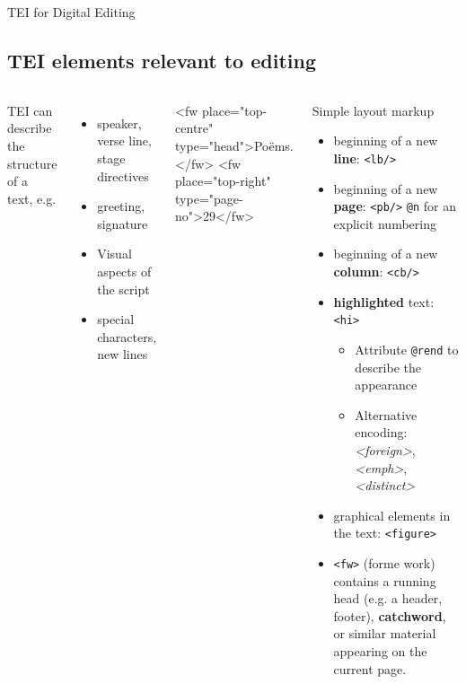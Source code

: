 \begin{frame}{TEI for Digital Editing}

\subsection{TEI elements relevant to editing}
\small

\begin{columns}
TEI can describe the structure of a text, e.g.
\begin{itemize}
\item  speaker, verse line, stage directives
\item  greeting, signature
\item  Visual aspects of the script
\item  special characters, new lines
\end{itemize}

\begin{xmlcode}
<fw place="top-centre" type="head">Poëms.</fw>
<fw place="top-right" type="page-no">29</fw>
\end{xmlcode}

\vspace{-3em}
\begin{block}{Simple layout markup}\footnotesize
\begin{itemize}
\item  beginning of a new \textbf{line}: \texttt{<lb/>}
\item  beginning of a new \textbf{page}: \texttt{<pb/>} \texttt{@n} for an explicit numbering
\item  beginning of a new \textbf{column}: \texttt{<cb/>}
\item  \textbf{highlighted} text: \texttt{<hi>}
\begin{itemize}\scriptsize
    \item Attribute \texttt{@rend} to describe the appearance
    \item Alternative encoding: \emph{<foreign>}, \emph{<emph>}, \emph{<distinct>}
\end{itemize}
\item  graphical elements in the text: \texttt{<figure>}
\item  \texttt{<fw>} (forme work) contains a running head (e.g.
a header, footer), \textbf{catchword}, or similar material
appearing on the current page.
\end{itemize}
\end{block}
\end{columns}



\end{frame}
